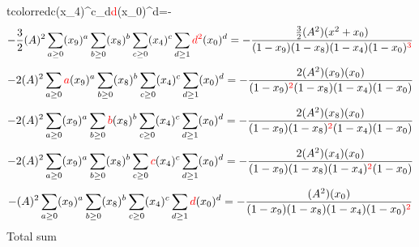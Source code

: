 \documentclass{article}
\begin{document}
tcolor{red}{c}(x_4)^{c}\sum_{d}\textcolor{red}{d}(x_0)^{d}=-\]\[-\frac{3}{2}(A)^{2}\sum_{a\geq{0}}(x_9)^{a}\sum_{b\geq{0}}(x_8)^{b}\sum_{c\geq{0}}(x_4)^{c}\sum_{d\geq{1}}\textcolor{red}{d^{2}}(x_0)^{d}=-\frac{\frac{3}{2}(A^{2})(x^{2}+x_0)}{(1-x_9)(1-x_8)(1-x_4)(1-x_0)^{\textcolor{red}{3}}}\]\[-2(A)^{2}\sum_{a\geq{0}}\textcolor{red}{a}(x_9)^{a}\sum_{b\geq{0}}(x_8)^{b}\sum_{c\geq{0}}(x_4)^{c}\sum_{d\geq{1}}(x_0)^{d}=-\frac{2(A^{2})(x_9)(x_0)}{(1-x_9)^{\textcolor{red}{2}}(1-x_8)(1-x_4)(1-x_0)}\]\[-2(A)^{2}\sum_{a\geq{0}}(x_9)^{a}\sum_{b\geq{0}}\textcolor{red}{b}(x_8)^{b}\sum_{c\geq{0}}(x_4)^{c}\sum_{d\geq{1}}(x_0)^{d}=-\frac{2(A^{2})(x_8)(x_0)}{(1-x_9)(1-x_8)^{\textcolor{red}{2}}(1-x_4)(1-x_0)}\]\[-2(A)^{2}\sum_{a\geq{0}}(x_9)^{a}\sum_{b\geq{0}}(x_8)^{b}\sum_{c\geq{0}}\textcolor{red}{c}(x_4)^{c}\sum_{d\geq{1}}(x_0)^{d}=-\frac{2(A^{2})(x_4)(x_0)}{(1-x_9)(1-x_8)(1-x_4)^{\textcolor{red}{2}}(1-x_0)}\]\[-(A)^{2}\sum_{a\geq{0}}(x_9)^{a}\sum_{b\geq{0}}(x_8)^{b}\sum_{c\geq{0}}(x_4)^{c}\sum_{d\geq{1}}\textcolor{red}{d}(x_0)^{d}=-\frac{(A^{2})(x_0)}{(1-x_9)(1-x_8)(1-x_4)(1-x_0)^{\textcolor{red}{2}}}\]
Total sum
\end{document}

